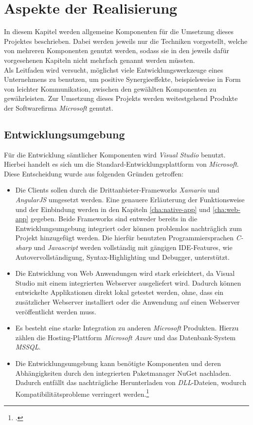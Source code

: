 \chapter{Aspekte der Realisierung}
\label{cha:realisierung}
In diesem Kapitel werden allgemeine Komponenten für die Umsetzung dieses Projektes beschrieben. Dabei werden jeweils nur die Techniken vorgestellt, welche von mehreren Komponenten genutzt werden, sodass sie in den jeweils dafür vorgesehenen Kapiteln nicht mehrfach genannt werden müssten. \\
Als Leitfaden wird versucht, möglichst viele Entwicklungswerkzeuge eines Unternehmens zu benutzen, um positive Synergieeffekte, beispielsweise in Form von leichter Kommunikation, zwischen den gewählten Komponenten zu gewährleisten. Zur Umsetzung dieses Projekts werden weitestgehend Produkte der Softwarefirma \textit{Microsoft} genutzt.

\section{Entwicklungsumgebung}
\label{sec:entwicklungsumgebung}
Für die Entwicklung sämtlicher Komponenten wird \textit{\ac{Visual Studio}} benutzt. Hierbei handelt es sich um die Standard-Entwicklungsplattform von \textit{Microsoft}. Diese Entscheidung wurde aus folgenden Gründen getroffen:
\begin{itemize}
\item Die Clients sollen durch die Drittanbieter-Frameworks \textit{Xamarin} und \textit{AngularJS} umgesetzt werden. Eine genauere Erläuterung der Funktionsweise und der Einbindung werden in den Kapiteln \ref{cha:native-app} und \ref{cha:web-app} gegeben. Beide Frameworks sind entweder bereits in die Entwicklungsumgebung integriert oder können problemlos nachträglich zum Projekt hinzugefügt werden. Die hierfür benutzten Programmiersprachen \textit{\gls{C-sharp}} und \textit{\gls{Javascript}} werden vollständig mit gängigen \ac{IDE}-Features, wie Autovervollständigung, Syntax-Highlighting und Debugger, unterstützt. 
\item Die Entwicklung von Web Anwendungen wird stark erleichtert, da \ac{Visual Studio} mit einem integrierten Webserver ausgeliefert wird. Dadurch können entwickelte Applikationen direkt lokal getestet werden, ohne, dass ein zusätzlicher Webserver installiert oder die Anwendung auf einen Webserver veröffentlicht werden muss.
\item Es besteht eine starke Integration zu anderen \textit{Microsoft} Produkten. Hierzu zählen die Hosting-Plattform \textit{Microsoft Azure} und das Datenbank-System \textit{\ac{MSSQL}}.
\item Die Entwicklungsumgebung kann benötigte Komponenten und deren Abhängigkeiten durch den integrierten Paketmanager \gls{NuGet} nachladen. Dadurch entfällt das nachträgliche Herunterladen von \textit{\ac{DLL}}-Dateien, wodurch Kompatibilitätsprobleme verringert werden.\footcite{online:VisualStudio}
\end{itemize}
